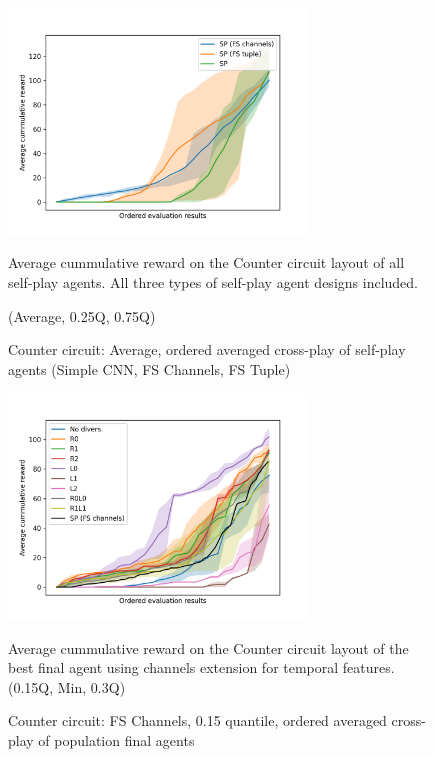 \begin{figure}[!ht]
    \centering
    \includegraphics*[width=8cm]{../img/CounterCircuitFSVariantsOrderedAvg.png}

    \caption{Counter circuit: Average, ordered averaged cross-play of self-play agents (Simple CNN, FS Channels, FS Tuple)}
    \label{CounterCircuitFSVariantsOrderedAvg}
    \medskip
    \small 
    Average cummulative reward on the Counter circuit layout of all self-play agents.
    All three types of self-play agent designs included.

    (Average, 0.25Q, 0.75Q)

\end{figure}


\begin{figure}[!ht]
    \centering
    \includegraphics*[width=8cm]{../img/CounterCircuitFSChannelsOrderedQ15.png}

    \caption{Counter circuit: FS Channels, 0.15 quantile, ordered averaged cross-play of population final agents}
    \label{CounterCircuitFSChannelsOrderedQ15}
    \medskip
    \small 
    Average cummulative reward on the Counter circuit layout of the best final agent using channels extension for temporal features.    
    (0.15Q, Min, 0.3Q)

\end{figure}

